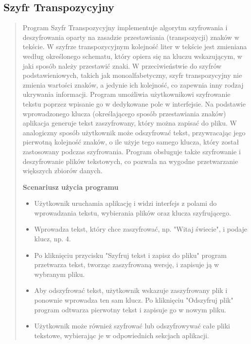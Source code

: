 \documentclass[12pt,a4paper]{article}
\begin{document}
\subsection{Szyfr Transpozycyjny}
\begin{quotation} \noindent Program Szyfr Transpozycyjny implementuje algorytm szyfrowania i deszyfrowania oparty na zasadzie przestawiania (transpozycji) znaków w tekście. W szyfrze transpozycyjnym kolejność liter w tekście jest zmieniana według określonego schematu, który opiera się na kluczu wskazującym, w jaki sposób należy przestawić znaki. W przeciwieństwie do szyfrów podstawieniowych, takich jak monoalfabetyczny, szyfr transpozycyjny nie zmienia wartości znaków, a jedynie ich kolejność, co zapewnia inny rodzaj ukrywania informacji. Program umożliwia użytkownikowi szyfrowanie tekstu poprzez wpisanie go w dedykowane pole w interfejsie. Na podstawie wprowadzonego klucza (określającego sposób przestawiania znaków) aplikacja generuje tekst zaszyfrowany, który można zapisać do pliku. W analogiczny sposób użytkownik może odszyfrować tekst, przywracając jego pierwotną kolejność znaków, o ile użyje tego samego klucza, który został zastosowany podczas szyfrowania. Program obsługuje także szyfrowanie i deszyfrowanie plików tekstowych, co pozwala na wygodne przetwarzanie większych zbiorów danych.\newline

\noindent\textbf{Scenariusz użycia programu}
\begin{itemize}
\item Użytkownik uruchamia aplikację i widzi interfejs z polami do wprowadzania tekstu, wybierania plików oraz klucza szyfrującego.
\item Wprowadza tekst, który chce zaszyfrować, np. "Witaj świecie", i podaje klucz, np. 4.
\item Po kliknięciu przycisku "Szyfruj tekst i zapisz do pliku" program przetwarza tekst, tworząc zaszyfrowaną wersję, i zapisuje ją w wybranym pliku.
\item Aby odszyfrować tekst, użytkownik wskazuje zaszyfrowany plik i ponownie wprowadza ten sam klucz. Po kliknięciu "Odszyfruj plik" program odtwarza pierwotny tekst i zapisuje go w nowym pliku.
\item Użytkownik może również szyfrować lub odszyfrowywać całe pliki tekstowe, wybierając je w odpowiednich sekcjach aplikacji.
\end{itemize}
\end{quotation}
\end{document}
